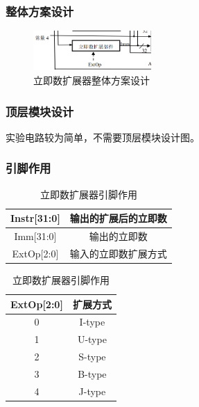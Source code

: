\documentclass{article}
\begin{document}
    \subsubsection{整体方案设计}
    \begin{figure}[H]
    \centering
    \includegraphics[width=0.4\textwidth]{4.1.png}
    \caption{立即数扩展器整体方案设计}
    \end{figure}

    \subsubsection{顶层模块设计}
    实验电路较为简单，不需要顶层模块设计图。

    \subsubsection{引脚作用}
    \begin{table}[H]
    \centering
    \begin{tabular}{|c|c|}
        \hline
        Instr[31:0]     & 输出的扩展后的立即数 \\ \hline
        Imm[31:0]   & 输出的立即数 \\ \hline
        ExtOp[2:0] & 输入的立即数扩展方式 \\ \hline
    \end{tabular}
    \caption{立即数扩展器引脚作用}
    \end{table}

    \begin{table}[H]
        \centering
        \begin{tabular}{|c|c|}
            \hline
            ExtOp[2:0]  & 扩展方式 \\ \hline
            0   & I-type \\ \hline
            1   & U-type \\ \hline
            2 & S-type \\ \hline
            3 & B-type \\ \hline
            4 & J-type \\ \hline
        \end{tabular}
        \caption{立即数扩展器引脚作用}
    \end{table}
\end{document}
